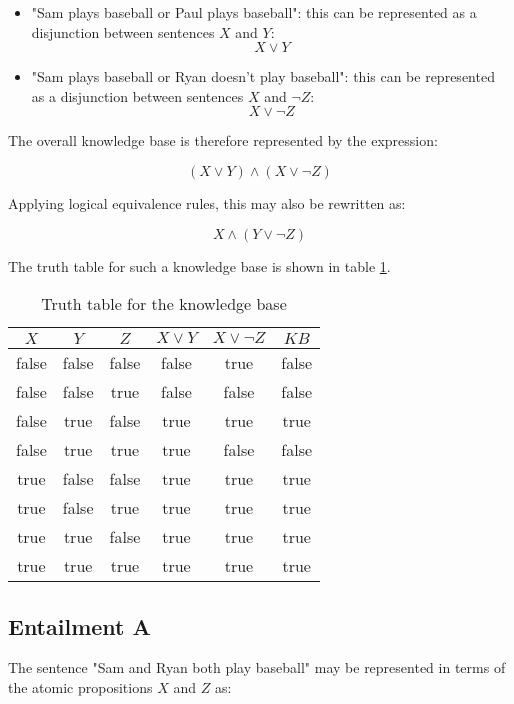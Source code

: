 \documentclass[letterpaper,headings=standardclasses]{scrartcl}
\begin{document}
\begin{itemize}
    \item "Sam plays baseball or Paul plays baseball": this can be represented as a disjunction between sentences $X$ and $Y$:
    $$ X \vee Y $$
    \item "Sam plays baseball or Ryan doesn't play baseball": this can be represented as a disjunction between sentences $X$ and $\neg Z$:
    $$ X \vee \neg Z $$
\end{itemize}

The overall knowledge base is therefore represented by the expression:

$$ (X \vee Y) \wedge (X \vee \neg Z) $$

Applying logical equivalence rules, this may also be rewritten as:

$$ X \wedge (Y \vee \neg Z) $$

The truth table for such a knowledge base is shown in table \ref{tt_kb}.

\begin{table}[h]
    \centering
    \begin{tabular}{|c|c|c|c|c|c|}
    \hline
    $X$ & $Y$ & $Z$ & $X \vee Y$ & $X \vee \neg Z$ & $KB$ \\ \hline
    false & false & false & false & true & false \\ \hline
    false & false & true & false & false & false \\ \hline
    false & true & false & true & true & true \\ \hline
    false & true & true & true & false & false \\ \hline
    true & false & false & true & true & true \\ \hline
    true & false & true & true & true & true \\ \hline
    true & true & false & true & true & true \\ \hline
    true & true & true & true & true & true \\ \hline
    \end{tabular}
    \caption{Truth table for the knowledge base}
    \label{tt_kb}
\end{table}

\subsection{Entailment A}

The sentence "Sam and Ryan both play baseball" may be represented in terms of the atomic propositions $X$ and $Z$ as:
\end{document}
